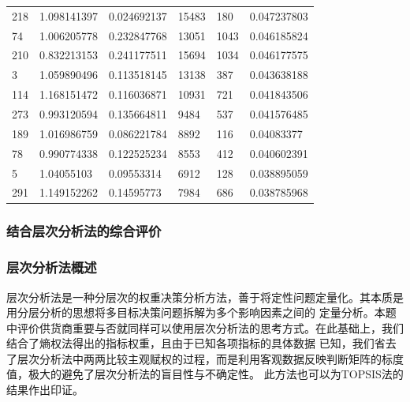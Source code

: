 \documentclass{cumcmthesis}
\begin{document}
\begin{longtable}{l|llll|l}
    218  & 1.098141397  & 0.024692137  & 15483    & 180            & 0.047237803    \\
    74   & 1.006205778  & 0.232847768  & 13051    & 1043           & 0.046185824    \\
    210  & 0.832213153  & 0.241177511  & 15694    & 1034           & 0.046177575    \\
    3    & 1.059890496  & 0.113518145  & 13138    & 387            & 0.043638188    \\
    114  & 1.168151472  & 0.116036871  & 10931    & 721            & 0.041843506    \\
    273  & 0.993120594  & 0.135664811  & 9484     & 537            & 0.041576485    \\
    189  & 1.016986759  & 0.086221784  & 8892     & 116            & 0.04083377     \\
    78   & 0.990774338  & 0.122525234  & 8553     & 412            & 0.040602391    \\
    5    & 1.04055103   & 0.09553314   & 6912     & 128            & 0.038895059    \\
    291  & 1.149152262  & 0.14595773   & 7984     & 686            & 0.038785968    \\
    \bottomrule
\end{longtable}

\subsubsection{结合层次分析法的综合评价}

\subsubsection*{层次分析法概述}
层次分析法是一种分层次的权重决策分析方法，善于将定性问题定量化。其本质是用分层分析的思想将多目标决策问题拆解为多个影响因素之间的
定量分析。本题中评价供货商重要与否就同样可以使用层次分析法的思考方式。在此基础上，我们结合了熵权法得出的指标权重，且由于已知各项指标的具体数据
已知，我们省去了层次分析法中两两比较主观赋权的过程，而是利用客观数据反映判断矩阵的标度值，极大的避免了层次分析法的盲目性与不确定性。
此方法也可以为TOPSIS法的结果作出印证。
\end{document}
